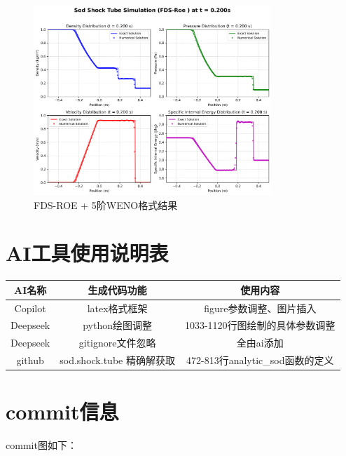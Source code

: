 \documentclass[12pt,a4paper]{article}
\begin{document}
\begin{figure}[!htbp]
    \centering
    \includegraphics[width=0.8\textwidth]{Sod_Shock_FDS-Roe _t_0p200s.png}
    \caption{FDS-ROE + 5阶WENO格式结果}
\end{figure}


\section{AI工具使用说明表}
\begin{table}[!htbp]
    \centering
    \begin{tabular}{|c|c|c|}
        \hline
        \textbf{AI名称} & \textbf{生成代码功能} & \textbf{使用内容} \\
        \hline
        Copilot & latex格式框架 & figure参数调整、图片插入\\
        \hline
        Deepseek & python绘图调整 & 1033-1120行图绘制的具体参数调整\\
        \hline
        Deepseek & gitignore文件忽略 & 全由ai添加\\
        \hline
        github & sod.shock.tube 精确解获取 & 472-813行analytic\_sod函数的定义\\
        \hline
\end{tabular}
\end{table}
\section{commit信息}
commit图如下：
\end{document}
